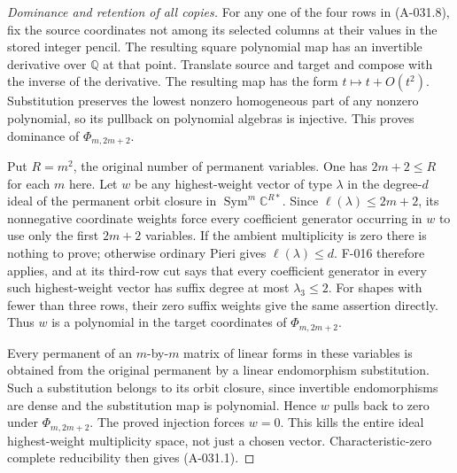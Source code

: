 \begin{proof}[Dominance and retention of all copies]
For any one of the four rows in (A-031.8), fix the source
coordinates not among its selected columns at their values in
the stored integer pencil. The resulting square polynomial map
has an invertible derivative over \(\mathbb Q\) at that point.
Translate source and target and compose with the inverse of the
derivative. The resulting map has the form \(t\mapsto t+O(t^2)\).
Substitution preserves the lowest nonzero homogeneous part of
any nonzero polynomial, so its pullback on polynomial algebras is
injective. This proves dominance of \(\Phi_{m,2m+2}\).

Put \(R=m^2\), the original number of permanent variables.
One has \(2m+2\leq R\) for each \(m\) here.
Let \(w\) be any highest-weight vector of type \(\lambda\)
in the degree-\(d\) ideal of the permanent orbit closure in
\(\operatorname{Sym}^m\mathbb C^{R*}\).
Since \(\ell(\lambda)\leq2m+2\), its nonnegative coordinate
weights force every coefficient generator occurring in \(w\)
to use only the first \(2m+2\) variables.
If the ambient multiplicity is zero there is nothing to prove;
otherwise ordinary Pieri gives \(\ell(\lambda)\leq d\).
F-016 therefore applies, and at its third-row cut says that every
coefficient generator in every such highest-weight vector has
suffix degree at most \(\lambda_3\leq2\). For shapes with fewer
than three rows, their zero suffix weights give the same assertion
directly. Thus \(w\) is a
polynomial in the target coordinates of \(\Phi_{m,2m+2}\).

Every permanent of an \(m\)-by-\(m\) matrix of linear forms in
these variables is obtained from the original permanent by a
linear endomorphism substitution. Such a substitution belongs to
its orbit closure, since invertible endomorphisms are dense and
the substitution map is polynomial. Hence \(w\) pulls back to zero
under \(\Phi_{m,2m+2}\). The proved injection forces \(w=0\).
This kills the entire ideal highest-weight multiplicity space,
not just a chosen vector. Characteristic-zero complete
reducibility then gives (A-031.1).
\end{proof}

